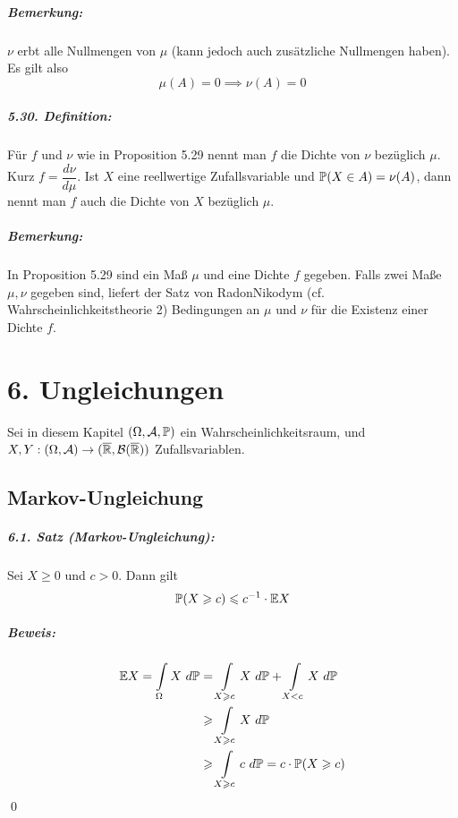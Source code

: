 \documentclass[12pt]{report}
\begin{document}
 \paragraph{Bemerkung:}$\nu$ erbt alle Nullmengen von $\mu$ (kann jedoch auch zus\"atzliche Nullmengen haben). Es gilt also 
 $$\mu(A)=0\implies\nu(A)=0$$
 
 \paragraph{5.30. Definition:}F\"ur $f$ und $\nu$ wie in Proposition 5.29 nennt man $f$ die Dichte von $\nu$ bez\"uglich $\mu$. Kurz $f=\dfrac{d\nu}{d\mu}$. Ist $X$ eine reellwertige Zufallsvariable und $\mathbb{P}(X\in A)=\nu(A)$, dann nennt man $f$ auch die Dichte von $X$ bez\"uglich $\mu$. 
 
 \paragraph{Bemerkung:}In Proposition 5.29 sind ein Ma\ss{} $\mu$ und eine Dichte $f$ gegeben. Falls zwei Ma\ss{}e $\mu,\nu$ gegeben sind, liefert der Satz von Radon\textendash Nikodym (cf. Wahrscheinlichkeitstheorie 2) Bedingungen an $\mu$ und $\nu$ f\"ur die Existenz einer Dichte $f$.
 
 \chapter*{6. Ungleichungen}

Sei in diesem Kapitel $(\Omega, \mathcal{A}, \mathbb{P})$ ein Wahrscheinlichkeitsraum, und $X,Y:(\Omega,\mathcal{A})\to(\overline{\mathbb{R}}, \mathcal{B}(\overline{\mathbb{R}}))$ Zufallsvariablen.


\section*{Markov-Ungleichung}

 
 \paragraph{6.1. Satz (Markov-Ungleichung):}Sei $X\geq0$ und $c>0$. Dann gilt
 $$\mathbb{P}(X\geqslant c)\leqslant c^{-1}\cdot\mathbb{E} X$$
 
 \paragraph{Beweis:}
 \begin{align*}
     \E X=\int\displaylimits_\Omega X\ d\Pp&=\int\displaylimits_{X\geq c}X\ d\Pp+\int\displaylimits_{X<c}X\ d\Pp\\
     &\geq\int\displaylimits_{X\geq c}X\ d\Pp\\
     &\geq \int\displaylimits_{X\geq c}c\ d\Pp=c\cdot \Pp(X\geq c)
 \end{align*}
\qed
\end{document}
